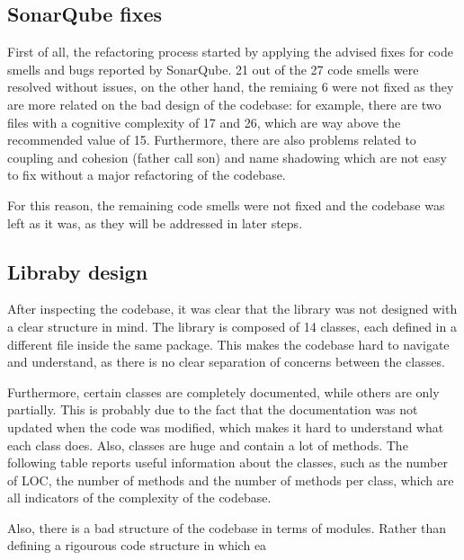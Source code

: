 \subsection{SonarQube fixes}

First of all, the refactoring process started by applying the advised fixes for code smells and bugs reported by SonarQube. 21 out of the 27 code smells were resolved without issues, on the other hand, the remiaing 6 were not fixed as they are more related on the bad design of the codebase: for example,  there are two files with a cognitive complexity of 17 and 26, which are way above the recommended value of 15. Furthermore, there are also problems related to coupling and cohesion (father call son) and name shadowing which are not easy to fix without a major refactoring of the codebase.

For this reason, the remaining code smells were not fixed and the codebase was left as it was, as they will be addressed in later steps.

\subsection{Libraby design}

After inspecting the codebase, it was clear that the library was not designed with a clear structure in mind. The library is composed of 14 classes, each defined in a different file inside the same package. This makes the codebase hard to navigate and understand, as there is no clear separation of concerns between the classes.

Furthermore, certain classes are completely documented, while others are only partially. This is probably due to the fact that the documentation was not updated when the code was modified, which makes it hard to understand what each class does. Also, classes are huge and contain a lot of methods. The following table reports useful information about the classes, such as the number of LOC, the number of methods and the number of methods per class, which are all indicators of the complexity of the codebase.

Also, there is a bad structure of the codebase in terms of modules. Rather than defining a rigourous code structure in which ea


